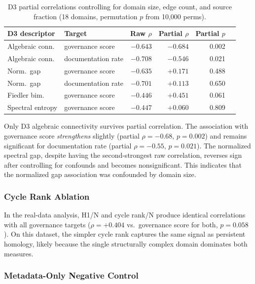 \documentclass[11pt,a4paper]{article}
\begin{document}
\begin{table}[htb]
\centering
\caption{D3 partial correlations controlling for domain size, edge count,
  and source fraction (18 domains, permutation $p$ from 10,000 perms).}
\label{tab:partial}
\begin{tabular}{llrrrr}
\toprule
D3 descriptor & Target & Raw $\rho$ & Partial $\rho$ & Partial $p$ \\
\midrule
Algebraic conn. & governance score & $-0.643$ & $-0.684$ & 0.002 \\
Algebraic conn. & documentation rate & $-0.708$ & $-0.546$ & 0.021 \\
Norm.\ gap & governance score & $-0.635$ & $+0.171$ & 0.488 \\
Norm.\ gap & documentation rate & $-0.701$ & $+0.113$ & 0.650 \\
Fiedler bim. & governance score & $-0.446$ & $+0.451$ & 0.061 \\
Spectral entropy & governance score & $-0.447$ & $+0.060$ & 0.809 \\
\bottomrule
\end{tabular}
\end{table}

Only D3 algebraic connectivity survives partial correlation. The
association with governance score \emph{strengthens} slightly (partial
$\rho = -0.68$, $p = 0.002$) and remains significant for documentation
rate (partial $\rho = -0.55$, $p = 0.021$). The normalized spectral
gap, despite having the second-strongest raw correlation, reverses sign
after controlling for confounds and becomes nonsignificant. This
indicates that the normalized gap association was confounded by domain
size.

\subsubsection{Cycle Rank Ablation}

In the real-data analysis, H1/N and cycle rank/N produce identical
correlations with all governance targets ($\rho = +0.404$ vs.\
governance score for both, $p = 0.058$). On this dataset, the simpler
cycle rank captures the same signal as persistent homology, likely
because the single structurally complex domain dominates both measures.

\subsubsection{Metadata-Only Negative Control}
\end{document}

